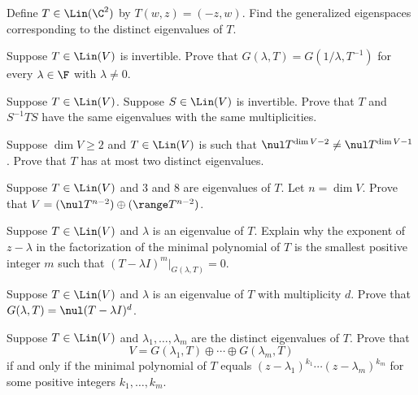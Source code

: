 \begin{exc}

\begin{exercise}
Define $T\in\Lin(\C^2)$ by $T(w,z)=(-z,w)$. Find the generalized eigenspaces
corresponding to the distinct eigenvalues of $T$.
\end{exercise}

\begin{exercise}
Suppose $T\in\Lin(V)$ is invertible. Prove that
$G(\lambda,T)=G(1/\lambda,T^{-1})$ for every $\lambda\in\F$
with $\lambda\ne0$.
\end{exercise}

\begin{exercise}
Suppose $T\in\Lin(V)$. Suppose $S\in\Lin(V)$ is invertible. Prove that $T$ and
$S^{-1}TS$ have the same eigenvalues with the same multiplicities.
\end{exercise}

\begin{exercise}
Suppose $\dim V\ge2$ and $T\in\Lin(V)$ is such that
$\nul T^{\dim V-2}\ne\nul T^{\dim V-1}$. Prove that $T$ has at most two
distinct eigenvalues.
\end{exercise}

\begin{exercise}
Suppose $T\in\Lin(V)$ and $3$ and $8$ are eigenvalues of $T$. Let $n=\dim V$.
Prove that $V=(\nul T^{n-2})\oplus(\range T^{n-2})$.
\end{exercise}

\begin{exercise}
Suppose $T\in\Lin(V)$ and $\lambda$ is an eigenvalue of $T$. Explain why the
exponent of $z-\lambda$ in the factorization of the minimal polynomial of $T$
is the smallest positive integer $m$ such that
$(T-\lambda I)^m|_{G(\lambda,T)}=0$.
\end{exercise}

\begin{exercise}
Suppose $T\in\Lin(V)$ and $\lambda$ is an eigenvalue of $T$ with multiplicity
$d$. Prove that $G(\lambda,T)=\nul(T-\lambda I)^d$.
\end{exercise}

\begin{exercise}
Suppose $T\in\Lin(V)$ and $\lambda_1,\dots,\lambda_m$ are the distinct
eigenvalues of $T$. Prove that
\[ V = G(\lambda_1,T)\oplus\cdots\oplus G(\lambda_m,T) \]
if and only if the minimal polynomial of $T$ equals
$(z-\lambda_1)^{k_1}\cdots(z-\lambda_m)^{k_m}$ for some positive integers
$k_1,\dots,k_m$.
\end{exercise}


\end{exc}

